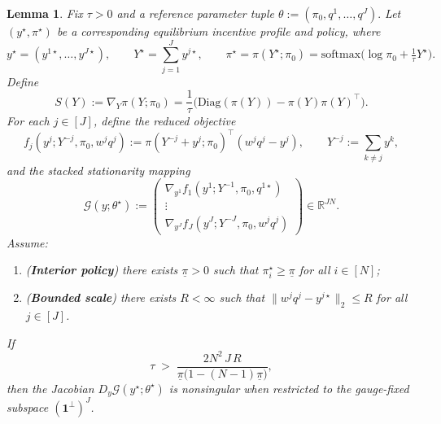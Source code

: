 \documentclass{article}
\newtheorem{lemma}{Lemma}
\begin{document}

\begin{lemma}
\label{lem:tau-implies-nonsingular}
Fix \(\tau>0\) and a reference parameter tuple
\(
\theta := (\pi_0,q^{1},\dots,q^{J}).
\)
Let \((y^\star,\pi^\star)\) be a corresponding equilibrium incentive profile and policy, where
\[
y^\star=(y^{1\star},\dots,y^{J\star}),
\qquad
Y^\star=\sum_{j=1}^J y^{j\star},
\qquad
\pi^\star=\pi(Y^\star;\pi_0)
=\mathrm{softmax}\!\Big(\log\pi_0+\tfrac{1}{\tau}Y^\star\Big).
\]
Define
\[
S(Y):=\nabla_Y \pi(Y;\pi_0)
=\frac{1}{\tau}\Big(\mathrm{Diag}(\pi(Y))-\pi(Y)\pi(Y)^\top\Big).
\]
For each \(j\in[J]\), define the reduced objective
\[
f_j(y^j;Y^{-j},\pi_0,w^jq^j)
:=\pi(Y^{-j}+y^j;\pi_0)^\top(w^jq^j-y^j),
\qquad
Y^{-j}:=\sum_{k\neq j}y^k,
\]
and the stacked stationarity mapping
\[
\mathcal{G}(y;\theta^\star)
:=
\begin{pmatrix}
\nabla_{y^1} f_1(y^1;Y^{-1},\pi_0,q^{1\star})\\
\vdots\\
\nabla_{y^J} f_J(y^J;Y^{-J},\pi_0,w^jq^j)
\end{pmatrix}
\in\mathbb{R}^{JN}.
\]
Assume:
\begin{enumerate}
\item[(a)] (\textbf{Interior policy}) there exists \(\underline\pi>0\) such that \(\pi_i^\star\ge \underline\pi\) for all \(i\in[N]\);
\item[(b)] (\textbf{Bounded scale}) there exists \(R<\infty\) such that \(\|w^jq^{j}-y^{j\star}\|_2\le R\) for all \(j\in[J]\).
\end{enumerate}
If
\begin{equation}
\label{eq:tau-threshold-explicit}
\tau \;>\; \frac{2N^2\,J\,R}{\underline\pi\bigl(1-(N-1)\underline\pi\bigr)},
\end{equation}
then the Jacobian \(D_y\mathcal{G}(y^\star;\theta^\star)\) is nonsingular when restricted to the gauge-fixed subspace
\((\mathbf 1^\perp)^J\).
\end{lemma}
\end{document}
